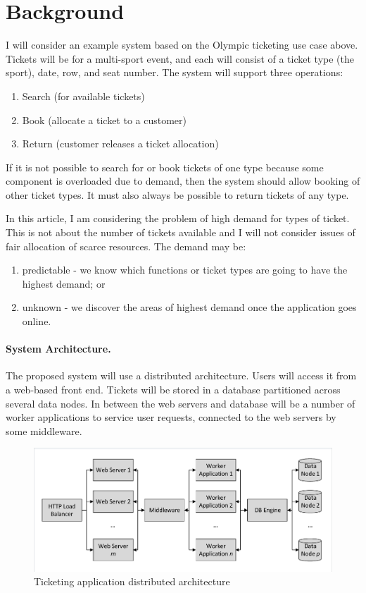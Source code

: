 \documentclass{llncs}
\begin{document}
\section{Background}

I will consider an example system based on the Olympic ticketing use case above.  Tickets will be for a multi-sport event, and each will consist of a ticket type (the sport), date, row, and seat number.  The system will support three operations:
\begin{enumerate}
\item Search (for available tickets)
\item Book (allocate a ticket to a customer)
\item Return (customer releases a ticket allocation)
\end{enumerate}

If it is not possible to search for or book tickets of one type because some component is overloaded due to demand, then the system should allow booking of other ticket types.  It must also always be possible to return tickets of any type.

In this article, I am considering the problem of high demand for types of ticket.  This is not about the number of tickets available and I will not consider issues of fair allocation of scarce resources.  The demand may be:
\begin{enumerate}
\item predictable - we know which functions or ticket types are going to have the highest demand; or
\item unknown - we discover the areas of highest demand once the application goes online.
\end{enumerate}

\paragraph{System Architecture.}

The proposed system will use a distributed architecture.  Users will access it from a web-based front end.  Tickets will be stored in a database partitioned across several data nodes.  In between the web servers and database will be a number of worker applications to service user requests, connected to the web servers by some middleware.

\begin{figure}
\caption{Ticketing application distributed architecture}
\centering
\includegraphics[trim = 5 5 5 5, clip, width=\textwidth]{application}
\end{figure}
\end{document}
